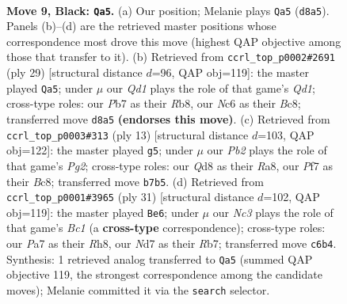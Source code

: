 \documentclass[11pt]{article}
\begin{document}
\clearpage

\begin{figure}[p]\centering
\begin{subfigure}{0.46\textwidth}\centering
\resizebox{\linewidth}{!}{%
\newchessgame
\chessboard[
  setfen={r1bq1b1r/pp1nkppp/2n1p3/3pP3/3P2Q1/3B2P1/PP1N1P1P/R1B1K1NR b KQ - 0 9},
  showmover=false,
  pgfstyle=straightmove, color=movearrow, markmove={d8-a5}
]}
\caption{}
\end{subfigure}\hfill
\begin{subfigure}{0.46\textwidth}\centering
\resizebox{\linewidth}{!}{%
\newchessgame
\chessboard[
  setfen={1rbqk2r/4bpp1/p2p1n1p/4p3/1p2P1P1/4BP2/PPPQN2P/1K1R1B1R b k - 1 15},
  showmover=false,
  pgfstyle=straightmove, color=movearrow, markmove={d8-a5}
]}
\caption{}
\end{subfigure}
\\[4pt]
\begin{subfigure}{0.46\textwidth}\centering
\resizebox{\linewidth}{!}{%
\newchessgame
\chessboard[
  setfen={rnbqkb1r/pp3pp1/3p1n1p/2pP4/4PB2/8/PP3PPP/RN1QKBNR b KQkq - 0 7},
  showmover=false,
  pgfstyle=straightmove, color=movearrow, markmove={g7-g5}
]}
\caption{}
\end{subfigure}\hfill
\begin{subfigure}{0.46\textwidth}\centering
\resizebox{\linewidth}{!}{%
\newchessgame
\chessboard[
  setfen={2bqk2r/1r2bpp1/p2p1n1p/4p3/1p2P1P1/4BP2/PPPQN2P/1K1R1B1R b k - 3 16},
  showmover=false,
  pgfstyle=straightmove, color=movearrow, markmove={c8-e6}
]}
\caption{}
\end{subfigure}
\caption{\textbf{Move 9, Black: \texttt{Qa5}.} (a) Our position; Melanie plays \texttt{Qa5} (\texttt{d8a5}). Panels (b)--(d) are the retrieved master positions whose correspondence most drove this move (highest QAP objective among those that transfer to it). (b) Retrieved from \texttt{ccrl\_top\_p0002\#2691} (ply 29) [structural distance $d$=96, QAP obj=119]: the master played \texttt{Qa5}; under $\mu$ our \emph{Qd1} plays the role of that game's \emph{Qd1}; cross-type roles: our \emph{P}b7 as their \emph{R}b8, our \emph{N}c6 as their \emph{B}c8; transferred move \texttt{d8a5} \textbf{(endorses this move)}. (c) Retrieved from \texttt{ccrl\_top\_p0003\#313} (ply 13) [structural distance $d$=103, QAP obj=122]: the master played \texttt{g5}; under $\mu$ our \emph{Pb2} plays the role of that game's \emph{Pg2}; cross-type roles: our \emph{Q}d8 as their \emph{R}a8, our \emph{P}f7 as their \emph{B}c8; transferred move \texttt{b7b5}. (d) Retrieved from \texttt{ccrl\_top\_p0001\#3965} (ply 31) [structural distance $d$=102, QAP obj=119]: the master played \texttt{Be6}; under $\mu$ our \emph{Nc3} plays the role of that game's \emph{Bc1} (a \textbf{cross-type} correspondence); cross-type roles: our \emph{P}a7 as their \emph{R}h8, our \emph{N}d7 as their \emph{R}b7; transferred move \texttt{c6b4}. Synthesis: 1 retrieved analog transferred to \texttt{Qa5} (summed QAP objective 119, the strongest correspondence among the candidate moves); Melanie committed it via the \texttt{search} selector.}
\label{fig:thought-m17}
\end{figure}
\end{document}
